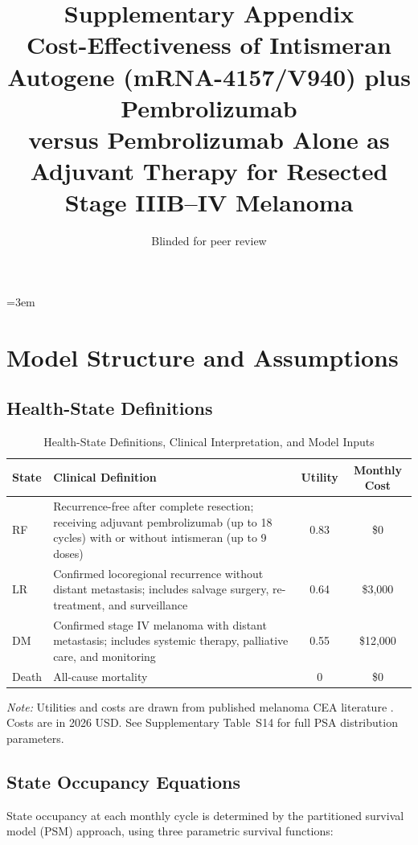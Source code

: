 \documentclass[11pt,a4paper]{article}
\title{Supplementary Appendix\\
\large Cost-Effectiveness of Intismeran Autogene (mRNA-4157/V940) plus Pembrolizumab\\
versus Pembrolizumab Alone as Adjuvant Therapy for Resected Stage IIIB--IV Melanoma}
\author{Blinded for peer review}
\date{}
\begin{document}
\emergencystretch=3em
\hfuzz=1pt
\maketitle
\tableofcontents
\newpage

\section{Model Structure and Assumptions}

\subsection{Health-State Definitions}
\label{sec:s1}
\begin{table}[H]
\centering
\caption{Health-State Definitions, Clinical Interpretation, and Model Inputs}
\label{tab:s1}
\begin{tabular}{lp{5cm}cc}
\toprule
\textbf{State} & \textbf{Clinical Definition} & \textbf{Utility} & \textbf{Monthly Cost} \\
\midrule
RF & Recurrence-free after complete resection; receiving adjuvant \mbox{pembrolizumab} (up to 18 cycles) with or without intismeran (up to 9 doses) & 0.83 & \$0 \\
LR & Confirmed locoregional recurrence without distant metastasis; includes salvage surgery, re-treatment, and surveillance & 0.64 & \$3,000 \\
DM & Confirmed stage IV melanoma with distant metastasis; includes systemic therapy, palliative care, and monitoring & 0.55 & \$12,000 \\
Death & All-cause mortality & 0 & \$0 \\
\bottomrule
\end{tabular}
\end{table}
\noindent\textit{Note:} Utilities and costs are drawn from published melanoma CEA literature \cite{bensimon2019, tran2021, zhang2023}. Costs are in 2026 USD. See Supplementary Table~S14 for full PSA distribution parameters.

\subsection{State Occupancy Equations}
\label{sec:s2}
State occupancy at each monthly cycle is determined by the partitioned survival model (PSM) approach, using three parametric survival functions:
\end{document}
